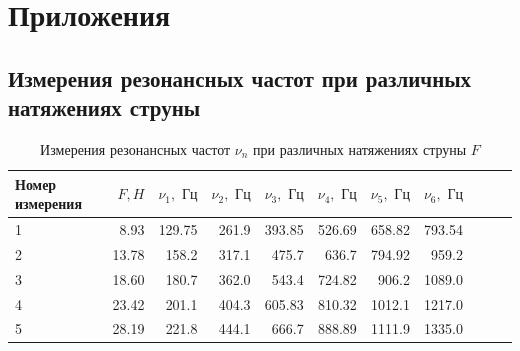 \documentclass[12pt]{article}
\begin{document}
\section{Приложения}
\subsection{Измерения резонансных частот при различных натяжениях струны} \label{app_1}
\begin{table}[H]
    \centering
    \begin{tabular}{|l|r|r|r|r|r|r|r|r|r|r|}
        \hline
        Номер измерения & $F, H$ & $\nu_1, \textrm{ Гц}$ & $\nu_2, \textrm{ Гц}$ & $\nu_3, \textrm{ Гц}$ & $\nu_4, \textrm{ Гц}$ & $\nu_5, \textrm{ Гц}$ & $\nu_6, \textrm{ Гц}$ \\
        \hline
        1               & 8.93   & 129.75                & 261.9                 & 393.85                & 526.69                & 658.82                & 793.54                \\
        2               & 13.78  & 158.2                 & 317.1                 & 475.7                 & 636.7                 & 794.92                & 959.2                 \\
        3               & 18.60  & 180.7                 & 362.0                 & 543.4                 & 724.82                & 906.2                 & 1089.0                \\
        4               & 23.42  & 201.1                 & 404.3                 & 605.83                & 810.32                & 1012.1                & 1217.0                \\
        5               & 28.19  & 221.8                 & 444.1                 & 666.7                 & 888.89                & 1111.9                & 1335.0                \\
        \hline
        
    \end{tabular}
    \caption{Измерения резонансных частот $\nu_n$ при различных натяжениях струны $F$}
    \label{tab:1}
\end{table}
\end{document}
